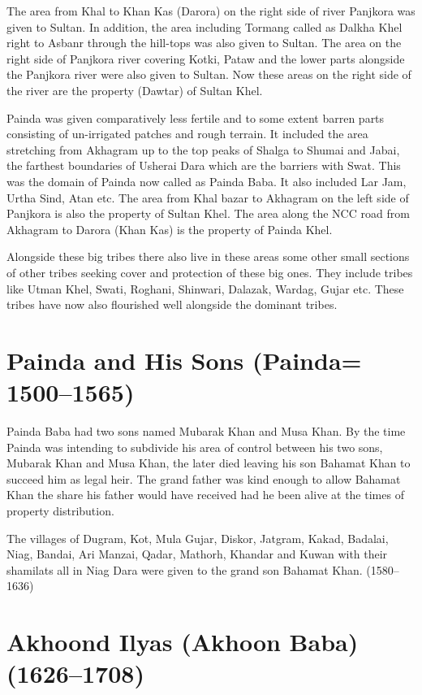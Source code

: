 \documentclass[twoside,openright]{book}
\begin{document}
The area from Khal to Khan Kas (Darora) on the right side of river Panjkora was
given to Sultan. In addition, the area including Tormang called as Dalkha Khel
right to Asbanr through the hill-tops was also given to Sultan. The area on the
right side of Panjkora river covering Kotki, Pataw and the lower parts alongside
the Panjkora river were also given to Sultan. Now these areas on the right side
of the river are the property (Dawtar) of Sultan Khel.

Painda was given comparatively less fertile and to some extent barren parts
consisting of un-irrigated patches and rough terrain. It included the area
stretching from Akhagram up to the top peaks of Shalga to Shumai and Jabai, the
farthest boundaries of Usherai Dara which are the barriers with Swat. This was
the domain of Painda now called as Painda Baba. It also included Lar Jam, Urtha
Sind, Atan etc. The area from Khal bazar to Akhagram on the left side of
Panjkora is also the property of Sultan Khel. The area along the NCC road from
Akhagram to Darora (Khan Kas) is the property of Painda Khel.

Alongside these big tribes there also live in these areas some other small
sections of other tribes seeking cover and protection of these big ones. They
include tribes like Utman Khel, Swati, Roghani, Shinwari, Dalazak, Wardag, Gujar
etc. These tribes have now also flourished well alongside the dominant tribes.

\section{Painda and His Sons (Painda= 1500--1565)}

Painda Baba had two sons named Mubarak Khan and Musa Khan. By the time Painda
was intending to subdivide his area of control between his two sons, Mubarak
Khan and Musa Khan, the later died leaving his son Bahamat Khan to succeed him
as legal heir. The grand father was kind enough to allow Bahamat Khan the share
his father would have received had he been alive at the times of property
distribution.


The villages of Dugram, Kot, Mula Gujar, Diskor, Jatgram,
Kakad, Badalai, Niag, Bandai, Ari Manzai, Qadar, Mathorh, Khandar
and Kuwan with their shamilats all in Niag Dara were given to the
grand son Bahamat Khan. (1580--1636)

\section{Akhoond Ilyas (Akhoon Baba) (1626--1708)}
\end{document}

